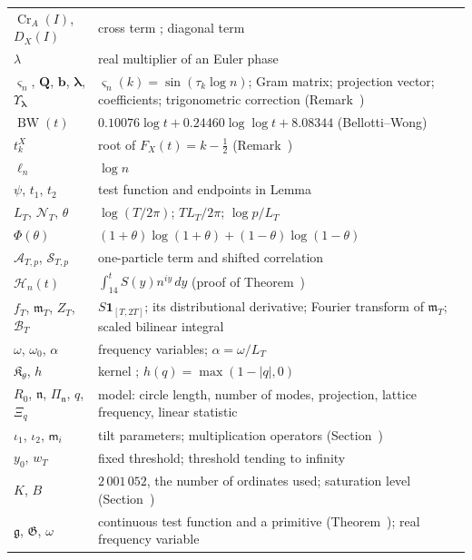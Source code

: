 \documentclass[preprint,12pt]{elsarticle}
\makeatletter
\let\CG@origref\ref
\let\CG@origeqref\eqref
\newcommand{\CG@gettip}[1]{\@ifundefined{CGTip@#1}{Reference: #1}{\csname CGTip@#1\endcsname}}
\DeclareRobustCommand{\CGref}[1]{\pdftooltip{\CG@origref{#1}}{\CG@gettip{#1}}}
\DeclareRobustCommand{\CGeqref}[1]{\pdftooltip{\CG@origeqref{#1}}{\CG@gettip{#1}}}
\numberwithin{equation}{section}
\theoremstyle{plain}
\theoremstyle{definition}
\theoremstyle{remark}
\newcommand{\Cr}{\operatorname{Cr}}
\newcommand{\BW}{\operatorname{BW}}
\makeatother
\begin{document}
\begin{center}
\begin{longtable}{p{}p{}}
$\Cr_A(I)$, $D_X(I)$ & cross term \CGeqref{eq:Cr_def}; diagonal term \CGeqref{eq:full_factor_gain}\\
$\lambda$ & real multiplier of an Euler phase\\
$\varsigma_n$, $\mathbf Q$, $\mathbf b$, $\boldsymbol\lambda$, $\Upsilon_{\boldsymbol\lambda}$ & $\varsigma_n(k)=\sin(\tau_k\log n)$; Gram matrix; projection vector; coefficients; trigonometric correction (Remark~\CGref{rem:matrix_projection})\\
$\BW(t)$ & $0.10076\log t+0.24460\log\log t+8.08344$ (Bellotti--Wong)\\
$t_k^X$ & root of $F_X(t)=k-\frac12$ (Remark~\CGref{rem:localization})\\
$\ell_n$ & $\log n$\\
$\psi$, $t_1$, $t_2$ & test function and endpoints in Lemma~\CGref{lem:first_moment_identity}\\
$L_T$, $\mathcal N_T$, $\theta$ & $\log(T/2\pi)$; $TL_T/2\pi$; $\log p/L_T$\\
$\Phi(\theta)$ & $(1+\theta)\log(1+\theta)+(1-\theta)\log(1-\theta)$\\
$\mathcal A_{T,p}$, $\mathcal S_{T,p}$ & one-particle term and shifted correlation \CGeqref{eq:ATp_STp}\\
$\mathcal H_n(t)$ & $\int_{14}^tS(y)n^{iy}\,dy$ (proof of Theorem~\CGref{thm:projection})\\
$f_T$, $\mathfrak m_T$, $Z_T$, $\mathcal B_T$ & $S\mathbf 1_{[T,2T]}$; its distributional derivative; Fourier transform of $\mathfrak m_T$; scaled bilinear integral \CGeqref{eq:BT_scaled}\\
$\omega$, $\omega_0$, $\alpha$ & frequency variables; $\alpha=\omega/L_T$\\
$\mathfrak K_\theta$, $h$ & kernel \CGeqref{eq:kernel_piecewise}; $h(q)=\max(1-|q|,0)$\\
$R_0$, $\mathfrak n$, $\Pi_{\mathfrak n}$, $q$, $\Xi_q$ & model: circle length, number of modes, projection, lattice frequency, linear statistic\\
$\iota_1$, $\iota_2$, $\mathsf m_i$ & tilt parameters; multiplication operators (Section~\CGref{subsec:det_model})\\
$y_0$, $w_T$ & fixed threshold; threshold tending to infinity\\
$K$, $B$ & $2\,001\,052$, the number of ordinates used; saturation level (Section~\CGref{subsec:one_step_cutoff})\\
$\mathfrak g$, $\mathfrak G$, $\omega$ & continuous test function and a primitive (Theorem~\CGref{thm:identity_g}); real frequency variable\\

\end{longtable}
\end{center}
\end{document}
